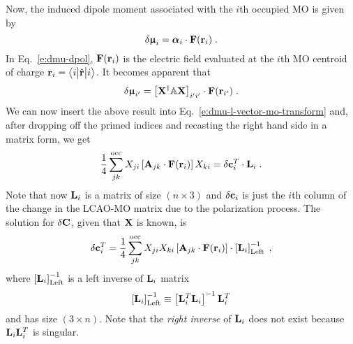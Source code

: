 \documentclass[aip,graphicx]{revtex4-1}
\newcommand{\tbraket}[3]{\ensuremath{\bigl\langle {#1} \bigl\lvert {#2} \bigl\lvert {#3} \bigr\rangle}}
\newcommand{\BM}[1]{\bm{#1}}
\begin{document}
Now, the induced dipole moment associated with the $i$th occupied
MO is given by
%
\begin{equation} \label{e:dmu-dpol}
 \delta {\BM{\upmu}}_i = {\BM{\alpha}}_i \cdot {\bf F}({\bf r}_i) \;.
\end{equation}
%
In Eq.~\eqref{e:dmu-dpol}, ${\bf F}({\bf r}_i)$ is the electric field evaluated at the $i$th MO centroid of charge
${\bf r}_i = \tbraket{i}{\hat{\bf r}}{i}$.
It becomes apparent that
%
\begin{equation} \label{e:dmu-dpol-expl}
 \delta {\BM{\upmu}}_{i'} = \left[ {\bf X}^\dagger {\mathbb A} {\bf X} \right]_{i'i'} \cdot {\bf F}({\bf r}_{i'}) \;.
\end{equation}
%
We can now insert the above result into Eq.~\eqref{e:dmu-l-vector-mo-transform} and, after dropping off the primed indices
and recasting the right hand side in a matrix form,
we get
%
\begin{equation} \label{e:dmu-l-vector-mo-transform-X}
 \frac{1}{4} \sum_{jk}^{\rm occ} X_{ji} \left[ {\bf A}_{jk} \cdot {\bf F}({\bf r}_i) \right] X_{ki}
   =
   \delta {\bf c}_i^T \cdot {\bf L}_i \;.
\end{equation}
%
Note that now ${\bf L}_i$ is a matrix of size $(n \times 3)$ and $\delta{\bf c}_i$ is just the $i$th column of the
change in the LCAO-MO matrix due to the polarization process.
%
%
The solution for $\delta {\bf C}$, given that ${\bf X}$ is known, is
%
\begin{equation} \label{e:mu-ind.matrix.linear.solution}
  \delta {\bf c}_i^T = \frac{1}{4}
                    \sum_{jk}^{\rm occ} X_{ji} X_{ki}
                    \left[ {\bf A}_{jk} \cdot {\bf F}({\bf r}_i) \right] \cdot
                    \left[ {\bf L}_i  \right]^{-1}_{\rm Left} \;,
\end{equation}
%
where $\left[ {\bf L}_i  \right]^{-1}_{\rm Left}$ is a left inverse
of ${\bf L}_i$ matrix 
%
\begin{equation} 
      \left[ {\bf L}_i  \right]^{-1}_{\rm Left}   \equiv
       \left[ {\bf L}_i^T {\bf L}_i \right]^{-1} {\bf L}_i^T 
\end{equation}
%
and has size $(3\times n)$. Note that the \emph{right inverse} of ${\bf L}_i$
does not exist because ${\bf L}_i {\bf L}_i^T$ is singular.
\end{document}
